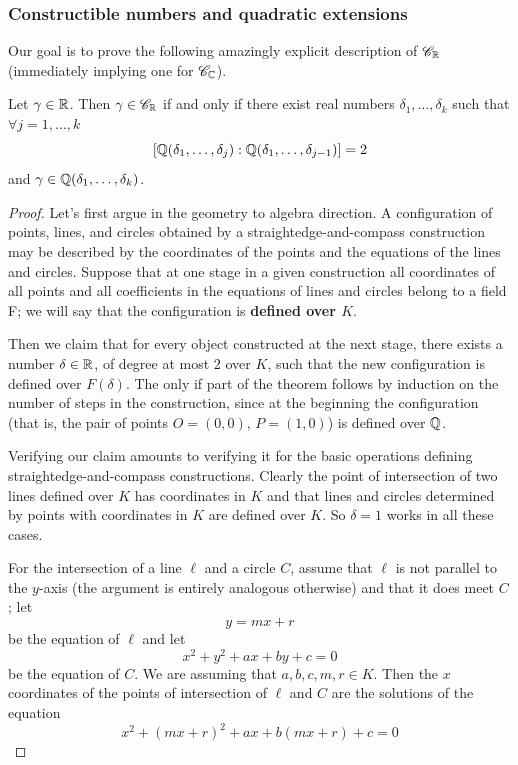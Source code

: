 \subsubsection{Constructible numbers and quadratic extensions}
Our goal is to prove the following amazingly explicit description of $\mathscr{C}_{\mathbb{R}}$ (immediately implying one for $\mathscr{C}_{\mathbb{C}}$).
\begin{theorem}\label{constructible number criterion}
Let $\gamma\in\mathbb{R}$. Then $\gamma\in\mathscr{C}_{\mathbb{R}}$ if and only if there exist real numbers $\delta_1,\dots,\delta_k$ such that $\forall j=1,\dots,k$
\[[\mathbb{Q}(\delta_1,\dots,\delta_j):\mathbb{Q}(\delta_1,\dots,\delta_{j-1})]=2\]
and $\gamma\in\mathbb{Q}(\delta_1,\dots,\delta_k)$.
\end{theorem}
\begin{proof}
Let's first argue in the geometry to algebra direction. A configuration of points, lines, and circles obtained by a straightedge-and-compass construction may be described by the coordinates of the points and the equations of the lines
and circles. Suppose that at one stage in a given construction all coordinates of all
points and all coefficients in the equations of lines and circles belong to a field F;
we will say that the configuration is \textbf{defined over $K$}.\par
Then we claim that for every object constructed at the next stage, there exists a number $\delta\in \mathbb{R}$, of degree at most $2$ over $K$, such that the new configuration is defined over $F(\delta)$. The only if part of the theorem follows by induction on the number of steps in the construction, since at the beginning the configuration (that is, the pair of points $O=(0,0)$, $P=(1,0)$) is defined over $\mathbb{Q}$.\par
Verifying our claim amounts to verifying it for the basic operations defining straightedge-and-compass constructions. Clearly the point of intersection of two lines defined over $K$ has coordinates in $K$ and that lines and circles determined by points with coordinates in $K$ are defined over $K$. So $\delta=1$ works in all these cases.\par
For the intersection of a line $\ell$ and a circle $C$, assume that $\ell$ is not parallel to the $y$-axis (the argument is entirely analogous otherwise) and that it does meet $C$; let
\[y=mx+r\]
be the equation of $\ell$ and let
\[x^2+y^2+ax+by+c=0\]
be the equation of $C$. We are assuming that $a,b,c,m,r\in K$. Then the $x$ coordinates of the points of intersection of $\ell$ and $C$ are the solutions of the equation
\[x^2+(mx+r)^2+ax+b(mx+r)+c=0\]

\end{proof}
